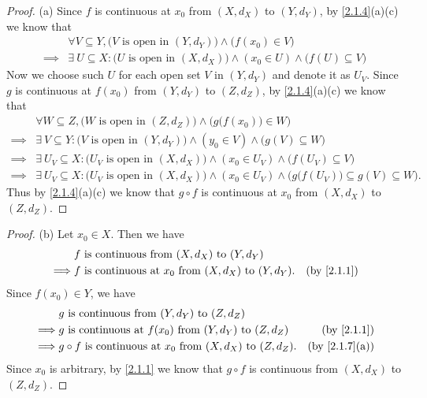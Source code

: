 \begin{proof}{(a)}
  Since \(f\) is continuous at \(x_0\) from \((X, d_X)\) to \((Y, d_Y)\), by \cref{2.1.4}(a)(c) we know that
  \begin{align*}
             & \forall V \subseteq Y, \big(V \text{ is open in } (Y, d_Y)\big) \land \big(f(x_0) \in V\big)                         \\
    \implies & \exists\ U \subseteq X : \big(U \text{ is open in } (X, d_X)\big) \land (x_0 \in U) \land \big(f(U) \subseteq V\big)
  \end{align*}
  Now we choose such \(U\) for each open set \(V\) in \((Y, d_Y)\) and denote it as \(U_V\).
  Since \(g\) is continuous at \(f(x_0)\) from \((Y, d_Y)\) to \((Z, d_Z)\), by \cref{2.1.4}(a)(c) we know that
  \begin{align*}
             & \forall W \subseteq Z, \big(W \text{ is open in } (Z, d_Z)\big) \land \Big(g\big(f(x_0)\big) \in W\Big)                                                 \\
    \implies & \exists\ V \subseteq Y : \big(V \text{ is open in } (Y, d_Y)\big) \land (y_0 \in V) \land \big(g(V) \subseteq W\big)                                    \\
    \implies & \exists\ U_V \subseteq X : \big(U_V \text{ is open in } (X, d_X)\big) \land (x_0 \in U_V) \land \big(f(U_V) \subseteq V\big)                            \\
    \implies & \exists\ U_V \subseteq X : \big(U_V \text{ is open in } (X, d_X)\big) \land (x_0 \in U_V) \land \Big(g\big(f(U_V)\big) \subseteq g(V) \subseteq W\Big).
  \end{align*}
  Thus by \cref{2.1.4}(a)(c) we know that \(g \circ f\) is continuous at \(x_0\) from \((X, d_X)\) to \((Z, d_Z)\).
\end{proof}

\begin{proof}{(b)}
  Let \(x_0 \in X\).
  Then we have
  \begin{align*}
             & f \text{ is continuous from } (X, d_X) \text{ to } (Y, d_Y)                                             \\
    \implies & f \text{ is continuous at } x_0 \text{ from } (X, d_X) \text{ to } (Y, d_Y). & \text{(by \cref{2.1.1})}
  \end{align*}
  Since \(f(x_0) \in Y\), we have
  \begin{align*}
             & g \text{ is continuous from } (Y, d_Y) \text{ to } (Z, d_Z)                                                        \\
    \implies & g \text{ is continuous at } f(x_0) \text{ from } (Y, d_Y) \text{ to } (Z, d_Z)       & \text{(by \cref{2.1.1})}    \\
    \implies & g \circ f \text{ is continuous at } x_0 \text{ from } (X, d_X) \text{ to } (Z, d_Z). & \text{(by \cref{2.1.7}(a))}
  \end{align*}
  Since \(x_0\) is arbitrary, by \cref{2.1.1} we know that \(g \circ f\) is continuous from \((X, d_X)\) to \((Z, d_Z)\).
\end{proof}

